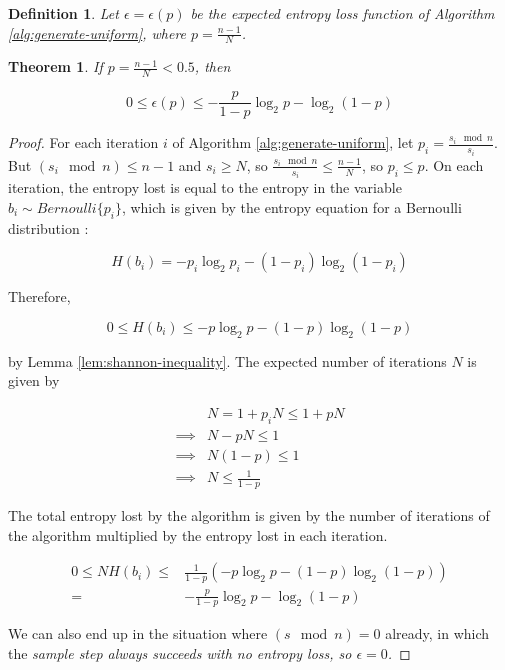 \documentclass[12pt]{article}
\newtheorem{definition}{Definition}
\newtheorem{theorem}{Theorem}
\begin{document}
\begin{definition}
    Let $\epsilon = \epsilon(p)$ be the expected entropy loss function of Algorithm \ref{alg:generate-uniform}, where $p=\frac{n-1}{N}$.
\end{definition}

\begin{theorem}
    \label{thm:loss}
If $p = \frac{n-1}{N} < 0.5$, then

\begin{equation}
0 \le \epsilon(p) \le -\frac{p}{1-p}\log_2p - \log_2(1-p)
\end{equation}

\end{theorem}

\begin{proof}
For each iteration $i$ of Algorithm \ref{alg:generate-uniform}, let $p_i = \frac{s_i \mod n}{s_i}$. But $(s_i \mod n) \le n-1$ and $s_i \ge N$, so $\frac{s_i \mod n}{s_i} \le \frac{n-1}{N}$, so $p_i \le p$. On each iteration, the entropy lost is equal to the entropy in the variable $b_i \sim Bernoulli\{p_i\}$, which is given by the entropy equation for a Bernoulli distribution \cite{cover1999elements}:

\begin{equation}
H(b_i) = -p_i\log_2p_i - (1-p_i)\log_2(1-p_i)
\end{equation}

Therefore, 

\begin{equation}
0 \le H(b_i) \le -p\log_2p - (1-p)\log_2(1-p) 
\end{equation}

by Lemma \ref{lem:shannon-inequality}. The expected number of iterations $N$ is given by

\begin{align}
& N = 1 + p_iN \le 1 + pN \\
\implies & N-pN \le 1 \\
\implies & N(1-p) \le 1 \\
\implies & N \le \frac{1}{1-p}
\end{align}

The total entropy lost by the algorithm is given by the number of iterations of the algorithm multiplied by the entropy lost in each iteration.

\begin{align}
0 \le NH(b_i) \le & \frac{1}{1-p}(-p\log_2p - (1-p)\log_2(1-p) ) \\
= & -\frac{p}{1-p}\log_2p - \log_2(1-p)
\end{align}

We can also end up in the situation where $(s \mod n) = 0$ already, in which the \em sample \em step always succeeds with no entropy loss, so $\epsilon=0$.
\end{proof}
\end{document}
